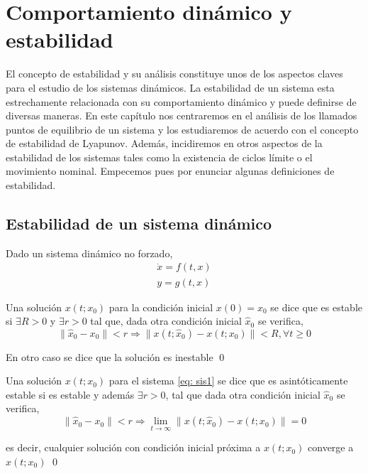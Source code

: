 \chapter{Comportamiento dinámico y estabilidad}
El concepto de estabilidad y su análisis constituye unos de los aspectos claves para el estudio de los sistemas dinámicos. La estabilidad de un sistema esta estrechamente relacionada con su comportamiento dinámico y puede definirse de diversas maneras. En este capítulo nos centraremos en el análisis de los llamados puntos de equilibrio de un sistema y los estudiaremos de acuerdo con el concepto de estabilidad de Lyapunov. Además, incidiremos en otros aspectos de la estabilidad de los sistemas tales como la existencia de ciclos límite o el movimiento nominal. Empecemos pues por enunciar algunas definiciones de estabilidad.



\section{Estabilidad de un sistema dinámico}
Dado un sistema dinámico no forzado,
\begin{align}
\dot{x} = f(t,x) \label{eq: sis1}\\
y = g(t,x)
\end{align}

\begin{definition}\label{esttr}
Una solución $x(t;x_0)$ para la condición inicial $x(0) = x_0$ se dice que es estable si  $\exists R>0$ y  $ \exists r>0$ tal que, dada otra condición inicial $\hat x_0$ se verifica,
\begin{equation}
\|\hat x_0-x_0\|<r \Rightarrow \|x(t;\hat x_0) - x(t;x_0)\|<R, \forall t \geq 0
\end{equation}

En otro caso se dice que la solución es inestable 
\qed
\end{definition}

\begin{definition}
Una solución $x(t;x_0)$ para el sistema \ref{eq: sis1} se dice que es asintóticamente estable si es estable y además  $\exists r>0$, tal que dada otra condición inicial $\hat x_0$ se verifica,
\begin{equation}
\|\hat x_0-x_0\|<r \Rightarrow \lim_{t \to \infty}\|x(t;\hat x_0) - x(t;x_0)\|=0
\end{equation}

es decir, cualquier solución con condición inicial próxima  a $x(t;x_0)$ converge a $x(t;x_0)$
\qed
\end{definition}

